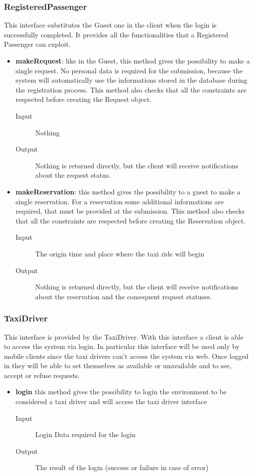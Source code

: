 		\subsubsection{RegisteredPassenger}
		This interface substitutes the Guest one in the client when the login is successfully completed.
		It provides all the	functionalities that a Registered Passenger can exploit.
		\begin{itemize}
			\item \textbf{makeRequest}: like in the Guest, this method gives the possibility to make a single request.
			No personal data is required for the submission, because the system will automatically use the
			informations stored in the database during the registration process. This method also checks that
			all the constraints are respected before creating the Request object.
			\begin{description}
				\item[Input] Nothing
				\item[Output] Nothing is returned directly, but the client will receive notifications about the
				request status.
			\end{description}
			\item \textbf{makeReservation}: this method gives the possibility to a guest to make a single reservation.
			For a reservation some additional informations are required, that must be provided at the submission.
			This method also checks that all the constraints are respected before creating the Reservation object.
			\begin{description}
				\item[Input] The origin time and place where the taxi ride will begin
				\item[Output] Nothing is returned directly, but the client will receive notifications about the
				reservation and the consequent request statuses.
			\end{description}
		\end{itemize}
		\subsubsection{TaxiDriver}
		This interface is provided by the TaxiDriver. With this interface a client is able to access the system via login. In particular this interface will be used only by mobile clients since the taxi drivers can't access the system via web. Once logged in they will be able to set themselves as available or unavailable and to see, accept or refuse requests.
		\begin{itemize}
			\item \textbf{login} this method gives the possibility to login the environment to be considered
			a taxi driver and will access the taxi driver interface
			\begin{description}
				\item[Input] Login Data required for the login
				\item[Output] The result of the login (success or failure in case of error)
			\end{description}
		\end{itemize}
